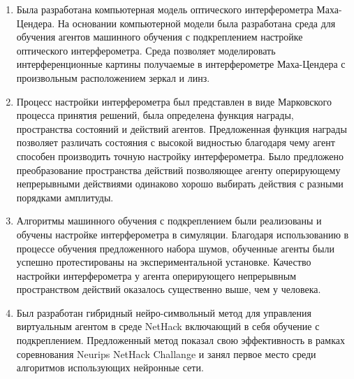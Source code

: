 \begin{enumerate}
  \item Была разработана компьютерная модель оптического интерферометра Маха-Цендера. На основании компьютерной модели была разработана среда для обучения агентов машинного обучения с подкреплением настройке оптического интерферометра. Среда позволяет моделировать интерференционные картины получаемые в интерферометре Маха-Цендера с произвольным расположением зеркал и линз. 
  \item Процесс настройки интерферометра был представлен в виде Марковского процесса принятия решений, была определена функция награды, пространства состояний и действий агентов. Предложенная функция награды позволяет различать состояния с высокой видностью благодаря чему агент способен производить точную настройку интерферометра. Было предложено преобразование пространства действий позволяющее агенту оперирующему непрерывными действиями одинаково хорошо выбирать действия с разными порядками амплитуды. 
  \item Алгоритмы машинного обучения с подкреплением были реализованы и обучены настройке интерферометра в симуляции. Благодаря использованию в процессе обучения предложенного набора шумов, обученные агенты были успешно протестированы на экспериментальной установке. Качество настройки интерферометра у агента оперирующего непрерывным пространством действий оказалось существенно выше, чем у человека. 
  \item Был разработан гибридный нейро-символьный метод для управления виртуальным агентом в среде NetHack включающий в себя обучение с подкреплением. Предложенный метод показал свою эффективность в рамках соревнования Neurips NetHack Challange и занял первое место среди алгоритмов использующих нейронные сети.
\end{enumerate}

\newpage
